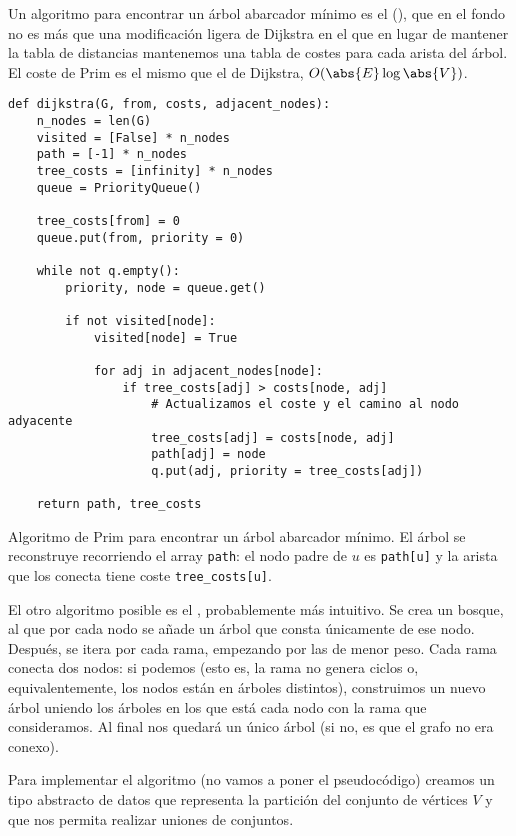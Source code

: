 \documentclass[palatino, nochap]{apuntes}
\begin{document}
Un algoritmo para encontrar un árbol abarcador mínimo es el  (), que en el fondo no es más que una modificación ligera de Dijkstra en el que en lugar de mantener la tabla de distancias mantenemos una tabla de costes para cada arista del árbol. El coste de Prim es el mismo que el de Dijkstra, $O(\abs{E} \log \abs{V})$.


\begin{listing}[hbtp]
\begin{verbatim}
def dijkstra(G, from, costs, adjacent_nodes):
	n_nodes = len(G)
	visited = [False] * n_nodes
	path = [-1] * n_nodes
	tree_costs = [infinity] * n_nodes
	queue = PriorityQueue()

	tree_costs[from] = 0
	queue.put(from, priority = 0)

	while not q.empty():
		priority, node = queue.get()

		if not visited[node]:
			visited[node] = True

			for adj in adjacent_nodes[node]:
				if tree_costs[adj] > costs[node, adj]
					# Actualizamos el coste y el camino al nodo adyacente
					tree_costs[adj] = costs[node, adj]
					path[adj] = node
					q.put(adj, priority = tree_costs[adj])

	return path, tree_costs
\end{verbatim}
\caption{Algoritmo de Prim para encontrar un árbol abarcador mínimo. El árbol se reconstruye recorriendo el array \texttt{path}: el nodo padre de $u$ es \texttt{path[u]} y la arista que los conecta tiene coste \texttt{tree\_costs[u]}.}
\label{lst:Prim}
\end{listing}

El otro algoritmo posible es el , probablemente más intuitivo. Se crea un bosque, al que por cada nodo se añade un árbol que consta únicamente de ese nodo. Después, se itera por cada rama, empezando por las de menor peso. Cada rama conecta dos nodos: si podemos (esto es, la rama no genera ciclos o, equivalentemente, los nodos están en árboles distintos), construimos un nuevo árbol uniendo los árboles en los que está cada nodo con la rama que consideramos. Al final nos quedará un único árbol (si no, es que el grafo no era conexo).

Para implementar el algoritmo (no vamos a poner el pseudocódigo) creamos un tipo abstracto de datos que representa la partición del conjunto de vértices $V$ y que nos permita realizar uniones de conjuntos.
\end{document}
